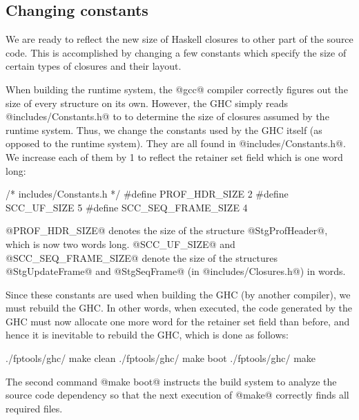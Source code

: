 \documentclass{article}
\begin{document}
\subsection{Changing constants}

We are ready to reflect the new size of Haskell closures to other part
of the source code.
This is accomplished by changing a few constants which specify the size
of certain types of closures and their layout.

When building the runtime system, the @gcc@ compiler correctly figures out
the size of every structure on its own.
However, 
the GHC simply reads @includes/Constants.h@ to to determine the size of 
closures assumed by the runtime system.
Thus, we change the constants used by the GHC itself (as opposed to
the runtime system). They are all found in @includes/Constants.h@.
We increase each of them by 1 to reflect the retainer set field which is one 
word long:
\begin{code}
/* includes/Constants.h */
#define PROF_HDR_SIZE       2
#define SCC_UF_SIZE         5
#define SCC_SEQ_FRAME_SIZE  4
\end{code}
@PROF_HDR_SIZE@ denotes the size of the structure @StgProfHeader@, which
is now two words long. 
@SCC_UF_SIZE@ and @SCC_SEQ_FRAME_SIZE@ denote the size of the structures
@StgUpdateFrame@ and @StgSeqFrame@ (in @includes/Closures.h@) in
words.

Since these constants are used when building the GHC (by another compiler), 
we must rebuild the GHC. In other words, when executed, the code generated by 
the GHC must now allocate one more word for the retainer set field than before,
and hence it is inevitable to rebuild the GHC, which is done as follows:

\begin{code}
./fptools/ghc/  make clean
./fptools/ghc/  make boot
./fptools/ghc/  make
\end{code}

The second command @make boot@ instructs the build system to analyze
the source code dependency so that the next execution of @make@ correctly
finds all required files.
\end{document}
